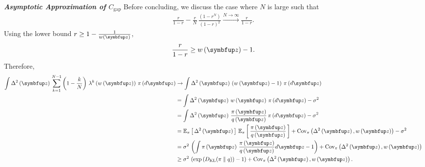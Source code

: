 \begin{proofEnd}
\textit{\textbf{Asymptotic Approximation of \(C_{\text{gap}}\)}}\quad
Before concluding, we discuss the case where \(N\) is large such that
\begin{align}
 \frac{r}{1-r} -
 \frac{r}{N}\,\frac{\left(1-r^N\right)}{{\left(1-r\right)}^2}
 \xrightarrow{N \rightarrow \infty}
 \frac{r}{1-r}.
\end{align}
Using the lower bound \(r \geq 1 - \frac{1}{w\left(\vz\right)}\),
\begin{align}
  \frac{r}{1-r} \geq w\left(\vz\right) - 1.
\end{align}
Therefore,
\begin{align}
  \int
  \Delta^2\left(\vz\right) \,
  \sum_{k=1}^{N-1} 
  \left(1 - \frac{k}{N}\right) \, \lambda^k\left(w\left(\vz\right)\right)
  \, \pi\left(d\vz\right)
  &\rightarrow
  \int
  \Delta^2\left(\vz\right) \,
  \left(
  w\left(\vz\right)
  -
  1
  \right)
  \, \pi\left(d\vz\right)
  \\
  &=
  \int
  \Delta^2\left(\vz\right) \,
  w\left(\vz\right)
  \, \pi\left(d\vz\right)
  - \sigma^2
  \\
  &=
  \int
  \Delta^2\left(\vz\right) \,
  \frac{\pi\left(\vz\right)}{q\left(\vz\right)}
  \, \pi\left(d\vz\right)
  - \sigma^2
  \\
  &=
  \Esub{\pi}{\Delta^2\left(\vz\right)} \, \Esub{\pi}{\frac{\pi\left(\vz\right)}{q\left(\vz\right)}}
  +
  \text{Cov}_{\pi}\left(\Delta^2\left(\vz\right), w\left(\vz\right) \right)
  - \sigma^2
  \\
  &=
  \sigma^2 \, \left(\int \pi\left(\vz\right)\,\frac{\pi\left(\vz\right)}{q\left(\vz\right)} d\vz  - 1\right)
  +
  \text{Cov}_{\pi}\left(\Delta^2\left(\vz\right), w\left(\vz\right) \right)
  \\
  &\geq
  \sigma^2 \, \left( \exp\left(\DKL{\pi}{q}\right) - 1\right)
  +
  \text{Cov}_{\pi}\left(\Delta^2\left(\vz\right), w\left(\vz\right) \right).
\end{align}
\end{proofEnd}

